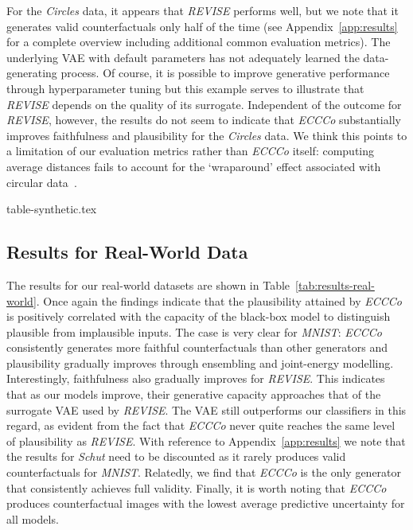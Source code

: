 For the \textit{Circles} data, it appears that \textit{REVISE} performs well, but we note that it generates valid counterfactuals only half of the time (see Appendix~\ref{app:results} for a complete overview including additional common evaluation metrics). The underlying VAE with default parameters has not adequately learned the data-generating process. Of course, it is possible to improve generative performance through hyperparameter tuning but this example serves to illustrate that \textit{REVISE} depends on the quality of its surrogate. Independent of the outcome for \textit{REVISE}, however, the results do not seem to indicate that \textit{ECCCo} substantially improves faithfulness and plausibility for the \textit{Circles} data. We think this points to a limitation of our evaluation metrics rather than \textit{ECCCo} itself: computing average distances fails to account for the `wraparound' effect associated with circular data~\citep{gill2010circular}.

{table-synthetic.tex}

\subsection{Results for Real-World Data}

The results for our real-world datasets are shown in Table~\ref{tab:results-real-world}. Once again the findings indicate that the plausibility attained by \textit{ECCCo} is positively correlated with the capacity of the black-box model to distinguish plausible from implausible inputs. The case is very clear for \textit{MNIST}: \textit{ECCCo} consistently generates more faithful counterfactuals than other generators and plausibility gradually improves through ensembling and joint-energy modelling. Interestingly, faithfulness also gradually improves for \textit{REVISE}. This indicates that as our models improve, their generative capacity approaches that of the surrogate VAE used by \textit{REVISE}. The VAE still outperforms our classifiers in this regard, as evident from the fact that \textit{ECCCo} never quite reaches the same level of plausibility as \textit{REVISE}. With reference to Appendix~\ref{app:results} we note that the results for \textit{Schut} need to be discounted as it rarely produces valid counterfactuals for \textit{MNIST}. Relatedly, we find that \textit{ECCCo} is the only generator that consistently achieves full validity. Finally, it is worth noting that \textit{ECCCo} produces counterfactual images with the lowest average predictive uncertainty for all models. 

